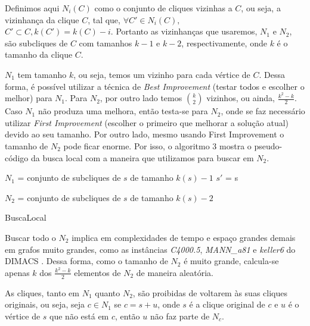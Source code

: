 \documentclass{article}
\begin{document}
Definimos aqui $N_i(C)$ como o conjunto de cliques vizinhas a $C$, ou seja, a vizinhança da clique $C$, tal que, $\forall C' \in N_i(C), $\\$C' \subset C,  k(C') = k(C)-i$. Portanto as vizinhanças que usaremos, $N_1$ e $N_2$, são subcliques de $C$ com tamanhos $k-1$ e $k-2$, respectivamente, onde $k$ é o tamanho da clique $C$.\par

$N_1$ tem tamanho $k$, ou seja, temos um vizinho para cada vértice de $C$. Dessa forma, é possível utilizar a técnica de \textit{Best Improvement} (testar todos e escolher o melhor) para $N_1$. Para $N_2$, por outro lado temos $\binom{k}{2}$  vizinhos, ou ainda, $\frac{k^2 - k}{2}$. Caso $N_1$ não produza uma melhora, então testa-se para $N_2$, onde se faz necessário utilizar \textit{First Improvement} (escolher o primeiro que melhorar a solução atual) devido ao seu tamanho. Por outro lado, mesmo usando First Improvement o tamanho de $N_2$ pode ficar enorme. Por isso, o algoritmo 3 mostra o pseudo-código da busca local com a maneira que utilizamos para buscar em $N_2$.\par

\begin{algorithm}
 $N_1$ = conjunto de subcliques de $s$ de tamanho $k(s)-1$\;
 $s'$ = s\;
 


 $N_2$ = conjunto de subcliques de $s$ de tamanho $k(s)-2$\;


 \caption{BuscaLocal}
\end{algorithm}

 Buscar todo o $N_2$ implica em complexidades de tempo e espaço grandes demais em grafos muito grandes, como as instâncias \textit{C4000.5}, \textit{MANN\_a81} e \textit{keller6} do DIMACS \cite{DIMACS2}. Dessa forma, como o tamanho de $N_2$ é muito grande, calcula-se apenas $k$ dos $\frac{k^2-k}{2}$ elementos de $N_2$ de maneira aleatória.\par

As cliques, tanto em $N_1$ quanto $N_2$, são proibidas de voltarem às suas cliques originais, ou seja, seja $c \in N_1$ se $c = s + u$, onde $s$ é a clique original de $c$ e $u$ é o vértice de $s$ que não está em $c$, então $u$ não faz parte de $N_c$.\par
\end{document}
